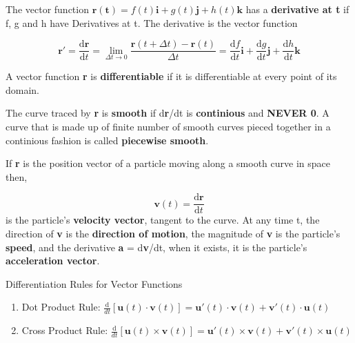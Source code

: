 \documentclass[12pt,a4paper]{article}
\newenvironment{definition}{\begin{definitionbox}}{\end{definitionbox}\vspace{1\baselineskip}}
\newenvironment{ruleBox}[1]{\begin{rulebox}{#1}}{\end{rulebox}\vspace{1\baselineskip}}
\begin{document}
\newpage

\begin{definition}
  The vector function \(\mathbf{r(t)} = f(t)\mathbf{i} + g(t)\mathbf{j} + h(t)\mathbf{k}\) has a \textbf{derivative at t} if f, g and h have Derivatives at t. The derivative is the vector function
  
  \[\mathbf{r}' = \frac{\mathrm{d}\mathbf{r}}{\mathrm{d}t} = \lim_{\Delta t \to 0} \frac{\mathbf{r}(t + \Delta t) - \mathbf{r}(t)}{\Delta t} = \frac{\mathrm{d}f}{\mathrm{d}t}\mathbf{i} + \frac{\mathrm{d}g}{\mathrm{d}t}\mathbf{j} + \frac{\mathrm{d}h}{\mathrm{d}t}\mathbf{k}\]  
\end{definition}

\noindent  A vector function \textbf{r} is \textbf{differentiable} if it is differentiable at every point of its domain. 

\noindent The curve traced by \textbf{r} is \textbf{smooth} if d\textbf{r}/dt is \textbf{continious} and \textbf{NEVER 0}.
\noindent A curve that is made up of finite number of smooth curves pieced together in a continious fashion is called \textbf{piecewise smooth}.



\begin{definition}
  If \textbf{r} is the position vector of a particle moving along a smooth curve in space then,

  \[\mathbf{v}(t) = \frac{\mathrm{d}\mathbf{r}}{\mathrm{d}t}\]
  is the particle's \textbf{velocity vector}, tangent to the curve. At any time t, the direction of \textbf{v} is the \textbf{direction of motion}, the magnitude of \textbf{v} is the particle's \textbf{speed}, and the derivative \textbf{a} = d\textbf{v}/dt, when it exists, it is the particle's \textbf{acceleration vector}.
\end{definition}


\begin{ruleBox}{Differentiation Rules for Vector Functions}
\begin{enumerate}
  \item Dot Product Rule: \(\frac{\mathrm{d}}{dt}\left[\mathbf{u}(t)\cdot\mathbf{v}(t)\right] = \mathbf{u}'(t)\cdot \mathbf{v}(t) + \mathbf{v}'(t)\cdot\mathbf{u}(t)\)
  \item Cross Product Rule: \(\frac{\mathrm{d}}{dt}\left[\mathbf{u}(t)\times\mathbf{v}(t)\right] = \mathbf{u}'(t)\times \mathbf{v}(t) + \mathbf{v}'(t)\times\mathbf{u}(t)\)
\end{enumerate}
\end{ruleBox}
\end{document}
